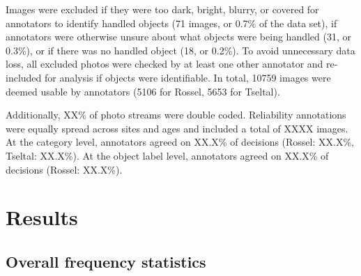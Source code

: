 \documentclass[10pt, letterpaper]{article}
\begin{document}
Images were excluded if they were too dark, bright, blurry, or covered
for annotators to identify handled objects (71 images, or 0.7\% of the
data set), if annotators were otherwise unsure about what objects were
being handled (31, or 0.3\%), or if there was no handled object (18, or
0.2\%). To avoid unnecessary data loss, all excluded photos were checked
by at least one other annotator and re-included for analysis if objects
were identifiable. In total, 10759 images were deemed usable by
annotators (5106 for Rossel, 5653 for Tseltal).

Additionally, XX\% of photo streams were double coded. Reliability
annotations were equally spread across sites and ages and included a
total of XXXX images. At the category level, annotators agreed on XX.X\%
of decisions (Rossel: XX.X\%, Tseltal: XX.X\%). At the object label
level, annotators agreed on XX.X\% of decisions (Rossel: XX.X\%).

\begin{table}[!ht]
\centering
{}
\caption{Non-study-related objects handled by the most children across categories and sites.} 
\label{tab:top-objects}
\end{table}

\hypertarget{results}{%
\section{Results}\label{results}}

\hypertarget{overall-frequency-statistics}{%
\subsection{Overall frequency
statistics}\label{overall-frequency-statistics}}
\end{document}
